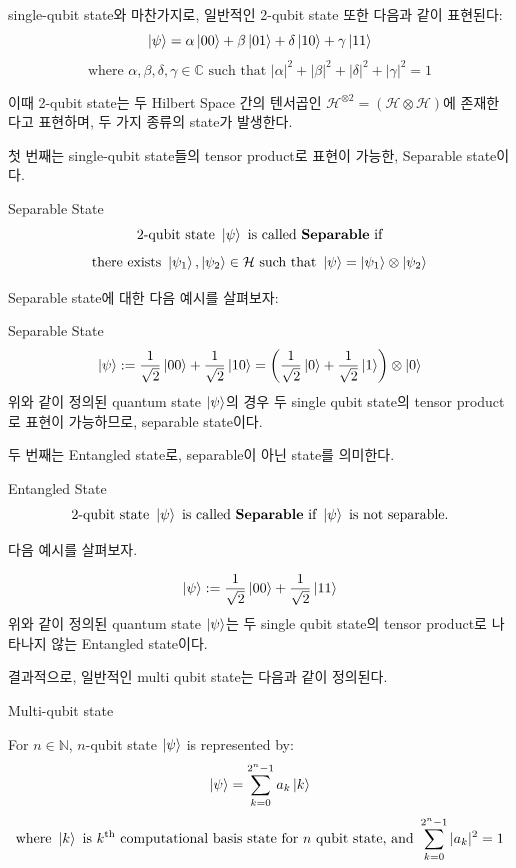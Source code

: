 \noindent single-qubit state와 마찬가지로, 일반적인 2-qubit state 또한 다음과 같이 표현된다:
\[
    \ket{\psi} = \alpha \ket{00} + \beta \ket{01} + \delta \ket{10} + \gamma \ket{11}
\]
\[
    \text{where } \alpha, \beta, \delta, \gamma \in \mathbb{C} \text{ such that } |\alpha|^2 + |\beta|^2 + |\delta|^2 + |\gamma|^2 = 1
\]

\noindent 이때 2-qubit state는 두 Hilbert Space 간의 텐서곱인 \(\mathcal{H}^{\otimes 2} = (\mathcal{H} \otimes \mathcal{H})\)에 존재한다고 표현하며, 두 가지 종류의 state가 발생한다.

\noindent 첫 번째는 single-qubit state들의 tensor product로 표현이 가능한, Separable state이다.
\begin{definition}
    Separable State
    \[
        \text{2-qubit state }\ket{\psi} \text{ is called \textbf{Separable} if}
    \]
    \[
        \text{there exists } \ket{\psi_1}, \ket{\psi_2} \in \mathcal{H} \text{ such that } \ket{\psi} = \ket{\psi_1} \otimes \ket{\psi_2}
    \]

\end{definition}
Separable state에 대한 다음 예시를 살펴보자:
\begin{example}
    Separable State
\[
    \ket \psi := {1 \over \sqrt{2}}\ket{00} + {1 \over \sqrt{2}}\ket{10} = \left({1 \over \sqrt{2}}\ket{0} + {1 \over \sqrt{2}}\ket{1}\right) \otimes \ket{0}
\]
위와 같이 정의된 quantum state \(\ket \psi\)의 경우 두 single qubit state의 tensor product로 표현이 가능하므로, separable state이다.
\end{example}

\noindent 두 번째는 Entangled state로, separable이 아닌 state를 의미한다.
\begin{definition}
    Entangled State
    \[
        \text{2-qubit state }\ket{\psi} \text{ is called \textbf{Separable} if } \ket\psi \text{ is not separable.}
    \]
\end{definition}

다음 예시를 살펴보자.
\begin{example}
\[
    \ket \psi := {1 \over \sqrt{2}}\ket{00} + {1 \over \sqrt{2}}\ket{11}
\]
위와 같이 정의된 quantum state \( \ket{\psi} \)는 두 single qubit state의 tensor product로 나타나지 않는 Entangled state이다.
\end{example}

\noindent 결과적으로, 일반적인 multi qubit state는 다음과 같이 정의된다.
\begin{definition}
Multi-qubit state

For \(n \in \mathbb{N}\), \(n\)-qubit state \(\ket{\psi}\) is represented by:
\[
    \ket{\psi} = \sum_{k = 0}^{2^n - 1} {a_k} \ket{k}
\]
\[
    \text{where } \ket{k} \text{ is }{k}^{\text{th}} \text{ computational basis state for } n \text{ qubit state, and } \sum^{2^n-1}_{k=0}{|a_k|^2} = 1
\]
\end{definition}

